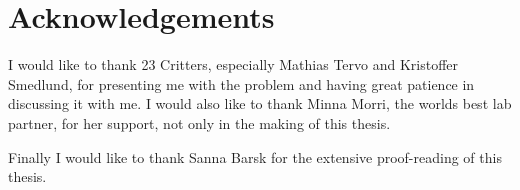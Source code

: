 \chapter{Acknowledgements}

I would like to thank 23 Critters, especially Mathias Tervo and Kristoffer Smedlund, for presenting me with the problem and having great patience in discussing it with me. I would also like to thank Minna Morri, the worlds best lab partner, for her support, not only in the making of this thesis. 

Finally I would like to thank Sanna Barsk for the extensive proof-reading of this thesis. 

